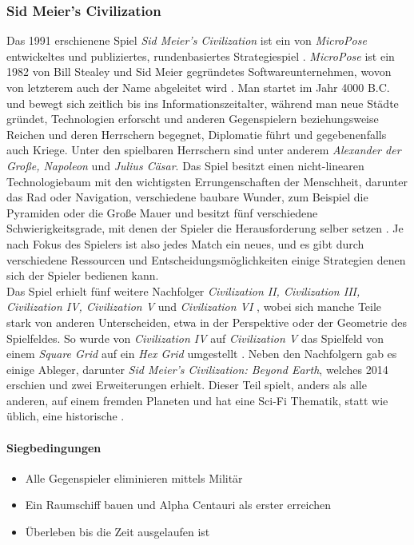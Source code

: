 \subsubsection{Sid Meier's Civilization}
Das 1991 erschienene Spiel \textit{Sid Meier's Civilization} ist ein von \textit{MicroPose} entwickeltes und publiziertes, rundenbasiertes Strategiespiel \cite*[]{civigdb}. \textit{MicroPose} ist ein 1982 von Bill Stealey und Sid Meier gegründetes Softwareunternehmen, wovon von letzterem auch der Name abgeleitet wird \cite*[]{civhistory}. Man startet im Jahr 4000 B.C. und bewegt sich zeitlich bis ins Informationszeitalter, während man neue Städte gründet, Technologien erforscht und anderen Gegenspielern beziehungsweise Reichen und deren Herrschern begegnet, Diplomatie führt und gegebenenfalls auch Kriege. Unter den spielbaren Herrschern sind unter anderem \textit{Alexander der Große, Napoleon} und \textit{Julius Cäsar}. Das Spiel besitzt einen nicht-linearen Technologiebaum mit den wichtigsten Errungenschaften der Menschheit, darunter das Rad oder Navigation, verschiedene baubare Wunder, zum Beispiel die Pyramiden oder die Große Mauer und besitzt fünf verschiedene Schwierigkeitsgrade, mit denen der Spieler die Herausforderung selber setzen \cite*[]{civ}. Je nach Fokus des Spielers ist also jedes Match ein neues, und es gibt durch verschiedene Ressourcen und Entscheidungsmöglichkeiten einige Strategien denen sich der Spieler bedienen kann. \\
Das Spiel erhielt fünf weitere Nachfolger \textit{Civilization II, Civilization III, Civilization IV, Civilization V} und \textit{Civilization VI} \cite*[]{civall}, wobei sich manche Teile stark von anderen Unterscheiden, etwa in der Perspektive oder der Geometrie des Spielfeldes. So wurde von \textit{Civilization IV} auf \textit{Civilization V} das Spielfeld von einem \textit{Square Grid} auf ein \textit{Hex Grid} umgestellt \cite*[]{civallcompare}. Neben den Nachfolgern gab es einige Ableger, darunter \textit{Sid Meier's Civilization: Beyond Earth}, welches 2014 erschien und zwei Erweiterungen erhielt. Dieser Teil spielt, anders als alle anderen, auf einem fremden Planeten und hat eine Sci-Fi Thematik, statt wie üblich, eine historische \cite*[]{civbe}.



\paragraph*{Siegbedingungen}
\begin{itemize}
    \item Alle Gegenspieler eliminieren mittels Militär
    \item Ein Raumschiff bauen und Alpha Centauri als erster erreichen
    \item Überleben bis die Zeit ausgelaufen ist
\end{itemize}\cite*[]{civwin}

